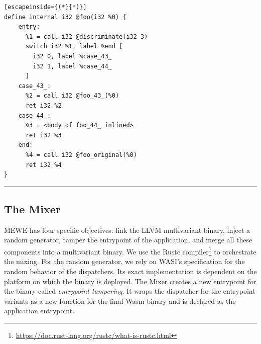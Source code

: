 \lstset{
    language=llvm,
    basicstyle=\footnotesize\ttfamily,
    columns=fullflexible,
    breaklines=true,
    numbers=none,
    stepnumber=1,
    float
}

\begin{code}
\scriptsize
\noindent\begin{minipage}[b]{\linewidth}
    \begin{minipage}[t]{1\linewidth}
        \begin{lstlisting}[escapeinside={(*}{*)}]
define internal i32 @foo(i32 %0) {
    entry:
      %1 = call i32 @discriminate(i32 3)
      switch i32 %1, label %end [
        i32 0, label %case_43_
        i32 1, label %case_44_
      ]
    case_43_:                 
      %2 = call i32 @foo_43_(%0)
      ret i32 %2
    case_44_:                
      %3 = <body of foo_44_ inlined>
      ret i32 %3
    end:                                             
      %4 = call i32 @foo_original(%0)
      ret i32 %4
}
        \end{lstlisting}
    \end{minipage}%
    
    \noindent\rule{\linewidth}{0.4pt}
    \label{listing:multivariant_template}
\end{minipage}
\end{code}

\subsection{The Mixer}

MEWE has four specific objectives: link the LLVM multivariant binary, inject a random generator, tamper the entrypoint of the application, and merge all these components into a multivariant \wasm binary.
We use the Rustc compiler\footnote{\url{https://doc.rust-lang.org/rustc/what-is-rustc.html}} to orchestrate the mixing.
For the random generator, we rely on WASI's specification \cite{WASI} for the random behavior of the dispatchers. Its exact implementation is dependent on the platform on which the binary is deployed.
The Mixer creates a new entrypoint for the binary called \emph{entrypoint tampering}.
It wraps the dispatcher for the entrypoint variants as a new function for the final Wasm  binary and is declared as the application entrypoint. %

